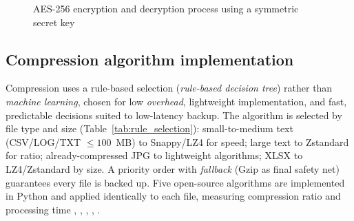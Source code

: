 \documentclass{iaesarticle}
\begin{document}
\begin{figure}[H]
\centering
{}
\vspace{.5em}
\caption{AES-256 encryption and decryption process using a symmetric secret key}
\label{fig:aes}
\end{figure}

\subsection{Compression algorithm implementation}
Compression uses a rule-based selection (\textit{rule-based decision tree}) rather than \textit{machine learning}, chosen for low \textit{overhead}, lightweight implementation, and fast, predictable decisions suited to low-latency backup. The algorithm is selected by file type and size (Table~\ref{tab:rule_selection}): small-to-medium text (CSV/LOG/TXT $\leq 100$~MB) to Snappy/LZ4 for speed; large text to Zstandard for ratio; already-compressed JPG to lightweight algorithms; XLSX to LZ4/Zstandard by size. A priority order with \textit{fallback} (Gzip as final safety net) guarantees every file is backed up. Five open-source algorithms are implemented in Python and applied identically to each file, measuring compression ratio and processing time \cite{36}, \cite{37}, \cite{38}, \cite{39}, \cite{22}.
\end{document}
